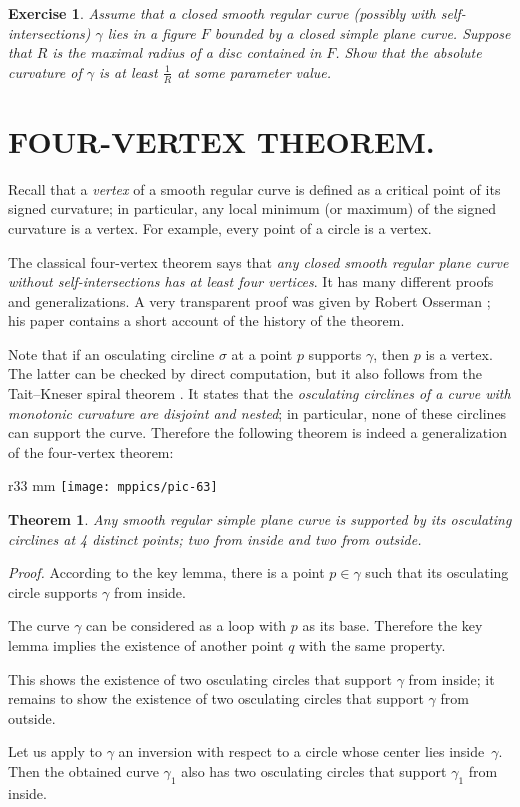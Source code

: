 \documentclass{article}
\theoremstyle{theorem}
\newtheorem{theorem}{Theorem}
\newtheorem*{exercise}{Exercise}
\theoremstyle{definition}
\begin{document}
\begin{exercise}\label{ex:moon-rad}
Assume that a closed smooth regular curve (possibly with self-intersections) $\gamma$  lies in a figure $F$ bounded by a closed simple plane curve.
Suppose that $R$ is the maximal radius of a disc contained in $F$.
Show that the absolute curvature of $\gamma$ is at least $\tfrac1R$ at some parameter value.
\end{exercise}


\section*{FOUR-VERTEX THEOREM.}
Recall that a \emph{vertex} of a smooth regular curve is defined as a critical point of its signed curvature;
in particular, any local minimum (or maximum) of the signed curvature is a vertex.
For example, every point of a circle is a vertex.

The classical four-vertex theorem says that \emph{any closed smooth regular plane curve without self-intersections has at least four vertices}.
It has many different proofs and generalizations.
A very transparent proof was given by Robert Osserman \cite{osserman}; his paper contains a short account of the history of the theorem.

Note that if an osculating circline $\sigma$ at a point $p$ supports $\gamma$, then $p$ is a vertex.
The latter can be checked by direct computation, but it also follows from the Tait--Kneser spiral theorem \cite{ghys-tabachnikov-timorin}.
It states that the \emph{osculating circlines of a curve with monotonic curvature are disjoint and nested};
in particular, none of these circlines can support the curve.
Therefore the following theorem is indeed a generalization of the four-vertex theorem:

{

\begin{wrapfigure}{r}{33 mm}
\vskip-4mm
\centering
\texttt{[image: mppics/pic-63]}
\vskip0mm
\end{wrapfigure}

\begin{theorem}\label{thm:4-vert}
Any smooth regular simple plane curve is supported by its osculating circlines at 4 distinct points; two from inside and two from outside.
\end{theorem}

\medskip\noindent\textit{Proof.}
According to the key lemma, there is a point $p\in\gamma$ such that its osculating circle supports $\gamma$ from inside.

The curve $\gamma$ can be considered as a loop with $p$ as its base.
Therefore the key lemma implies the existence of another point $q$ with the same property.


This shows the existence of two osculating circles that support $\gamma$ from inside;
it remains to show the existence of two osculating circles that support $\gamma$ from outside.

Let us apply to $\gamma$ an inversion with respect to a circle whose center lies inside~$\gamma$.
Then the obtained curve $\gamma_1$ also has  two osculating circles that support $\gamma_1$ from inside.

}
\end{document}
